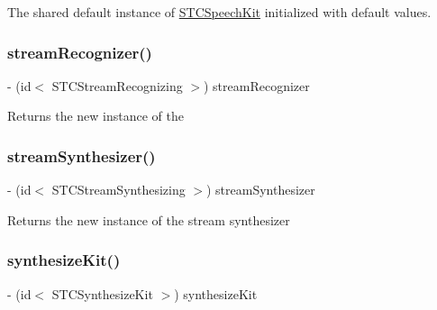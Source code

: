 The shared default instance of {\ttfamily \hyperlink{interface_s_t_c_speech_kit}{S\+T\+C\+Speech\+Kit}} initialized with default values. \hypertarget{interface_s_t_c_speech_kit_a1c6172cd2dd62d8378c2e706ab3ad8f7}{}\label{interface_s_t_c_speech_kit_a1c6172cd2dd62d8378c2e706ab3ad8f7} 
\subsubsection{\texorpdfstring{stream\+Recognizer()}{streamRecognizer()}}
{\footnotesize\ttfamily -\/ (id$<$ S\+T\+C\+Stream\+Recognizing $>$) stream\+Recognizer \begin{DoxyParamCaption}{ }\end{DoxyParamCaption}}

Returns the new instance of the \hypertarget{interface_s_t_c_speech_kit_a9574e9a1980085752a5f7b06ab7fe28c}{}\label{interface_s_t_c_speech_kit_a9574e9a1980085752a5f7b06ab7fe28c} 
\subsubsection{\texorpdfstring{stream\+Synthesizer()}{streamSynthesizer()}}
{\footnotesize\ttfamily -\/ (id$<$ S\+T\+C\+Stream\+Synthesizing $>$) stream\+Synthesizer \begin{DoxyParamCaption}{ }\end{DoxyParamCaption}}

Returns the new instance of the stream synthesizer \hypertarget{interface_s_t_c_speech_kit_ae2ffb20a43cc5c82600a73bd845dee63}{}\label{interface_s_t_c_speech_kit_ae2ffb20a43cc5c82600a73bd845dee63} 
\subsubsection{\texorpdfstring{synthesize\+Kit()}{synthesizeKit()}}
{\footnotesize\ttfamily -\/ (id$<$ S\+T\+C\+Synthesize\+Kit $>$) synthesize\+Kit \begin{DoxyParamCaption}{ }\end{DoxyParamCaption}}

